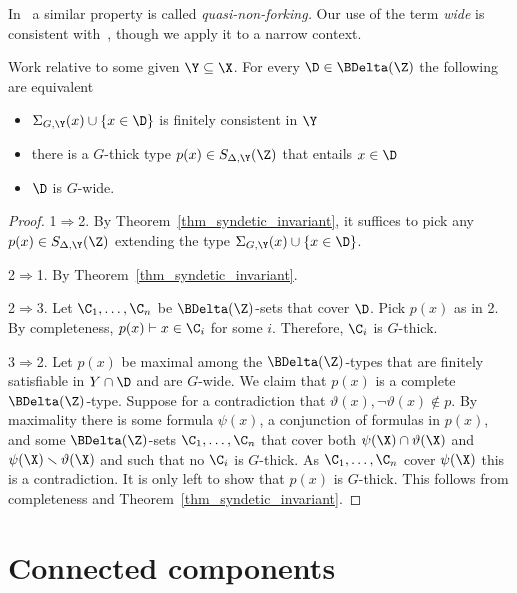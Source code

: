 In~\cite{CK} a similar property is called \textit{quasi-non-forking.}
Our use of the term \textit{wide\/} is consistent with~\cite{Hr}, though we apply it to a narrow context.

\begin{theorem}\label{thm_syndetic_invariant2}
  Work relative to some given $\Y\subseteq\X$.
  For every $\D\in\BDelta(\Z)$ the following are equivalent 
  \begin{itemize}
    \item[1.] $\Sigma_{G,\Y}(x)\cup\{x\in\D\}$ is finitely consistent in $\Y$
    \item[2.] there is a $G$-thick type $p(x)\in S_{\Delta,\Y}(\Z)$ that entails $x\in\D$
    \item[3.] $\D$ is $G$-wide.\smallskip
  \end{itemize}
\end{theorem}

\begin{proof}
  1$\Rightarrow$2.
  By Theorem~\ref{thm_syndetic_invariant}, it suffices to pick any $p(x)\in S_{\Delta,\Y}(\Z)$ extending the type $\Sigma_{G,\Y}(x)\cup\{x\in\D\}$.

  2$\Rightarrow$1.
  By Theorem~\ref{thm_syndetic_invariant}.

  2$\Rightarrow$3.
  Let $\C_1,\dots,\C_n$ be $\BDelta({\Z})$-sets that cover $\D$.
  Pick $p(x)$ as in 2.
  By completeness, $p(x)\vdash x\in\C_i$ for some $i$.
  Therefore, $\C_i$ is $G$-thick.

  3$\Rightarrow$2.
  Let $p(x)$ be maximal among the $\BDelta(\Z)$-types that are finitely satisfiable in $Y\cap\D$ and are $G$-wide.
  We claim that $p(x)$ is a complete $\BDelta(\Z)$-type.
  Suppose for a contradiction that $\vartheta(x),\neg\vartheta(x)\notin p$.
  By maximality there is some formula $\psi(x)$, a conjunction of formulas in $p(x)$, and some $\BDelta({\Z})$-sets $\C_1,\dots,\C_n$ that cover both $\psi(\X)\cap\vartheta(\X)$ and $\psi(\X)\smallsetminus\vartheta(\X)$ and such that no $\C_i$ is $G$-thick.
  As $\C_1,\dots,\C_n$ cover $\psi(\X)$ this is a contradiction.
  It is only left to show that $p(x)$ is $G$-thick.
  This follows from completeness and Theorem~\ref{thm_syndetic_invariant}.
\end{proof}


\section{Connected components}\label{G0}
\def\medrel#1{\parbox[t]{5ex}{$\displaystyle\hfil #1$}}
\def\ceq#1#2#3{\parbox[t]{12ex}{$\displaystyle #1$}\medrel{#2}{$\displaystyle #3$}}

